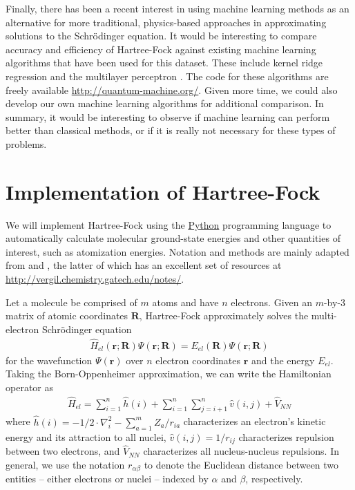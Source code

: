 \documentclass[12pt]{article}
\newcommand{\bd}[1]{\boldsymbol{#1}}
\newcommand{\Hel}{\hat{H}_{el}}
\begin{document}
Finally, there has been a recent interest in using machine learning methods as an alternative for more traditional, physics-based approaches in approximating solutions to the Schr\"odinger equation.  It would be interesting to compare accuracy and efficiency of Hartree-Fock against existing machine learning algorithms that have been used for this dataset.  These include kernel ridge regression \cite{rupp2012} and the multilayer perceptron \cite{montavon2012, montavon2013}.  The code for these algorithms are freely available \href{http://quantum-machine.org/}{http://quantum-machine.org/}.    Given more time, we could also develop our own machine learning algorithms for additional comparison.  In summary, it would be interesting to observe if machine learning can perform better than classical methods, or if it is really not necessary for these types of problems.

\section{Implementation of Hartree-Fock}
We will implement Hartree-Fock using the \href{https://www.python.org/}{Python} programming language to automatically calculate molecular ground-state energies and other quantities of interest, such as atomization energies.  Notation and methods are mainly  adapted from \cite{szabo2012} and \cite{sherrill2001}, the latter of which has an excellent set of resources at \href{http://vergil.chemistry.gatech.edu/notes/}{{http://vergil.chemistry.gatech.edu/notes/}}.

Let a molecule be comprised of $m$ atoms and have $n$ electrons.  Given an $m$-by-$3$ matrix of atomic coordinates $\bd R$, Hartree-Fock approximately solves the multi-electron Schr\"odinger equation
\begin{align*}
\Hel(\bd{r}; \bd{R}) \Psi(\bd{r}; \bd{R}) = E_{el}(\bd R) \Psi(\bd r ; \bd R)
\end{align*}    
for the wavefunction $\Psi(\bd r)$ over $n$ electron coordinates $\bd r$ and the energy $E_{el}$.  Taking the Born-Oppenheimer approximation, we can write the Hamiltonian operator as 
\begin{align*}
\Hel = \sum_{i=1}^n \hat{h}(i) + \sum_{i=1}^n \sum_{j=i+1}^n \hat{v}(i, j) + \hat{V}_{NN}
\end{align*} 
where $\hat{h}(i) = -1/2 \cdot \nabla_i^2 - \sum_{a=1}^{m} Z_a / r_{ia}$ characterizes an electron's kinetic energy and its attraction to all nuclei, $\hat{v}(i, j) = 1 / r_{ij}$ characterizes repulsion between two electrons, and $\hat{V}_{NN}$ characterizes all nucleus-nucleus repulsions.  In general, we use the notation $r_{\alpha \beta}$ to denote the Euclidean distance between two entities -- either electrons or nuclei -- indexed by $\alpha$ and $\beta$, respectively.  
\end{document}
